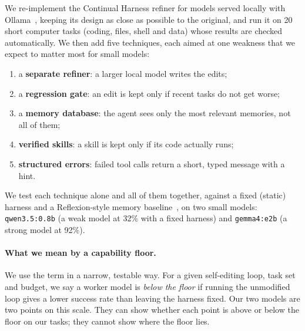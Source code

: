 We re-implement the Continual Harness refiner for models served locally with Ollama~\cite{ollama},
keeping its design as close as possible to the original, and run it on 20 short computer tasks
(coding, files, shell and data) whose results are checked automatically. We then add five
techniques, each aimed at one weakness that we expect to matter most for small models:
\begin{enumerate}
  \item a \textbf{separate refiner}: a larger local model writes the edits;
  \item a \textbf{regression gate}: an edit is kept only if recent tasks do not get worse;
  \item a \textbf{memory database}: the agent sees only the most relevant memories, not all of them;
  \item \textbf{verified skills}: a skill is kept only if its code actually runs;
  \item \textbf{structured errors}: failed tool calls return a short, typed message with a hint.
\end{enumerate}
We test each technique alone and all of them together, against a fixed (static) harness and a
Reflexion-style memory baseline~\cite{shinn2023reflexion}, on two small models: \texttt{qwen3.5:0.8b}
(a weak model at 32\% with a fixed harness) and \texttt{gemma4:e2b} (a strong model at 92\%).

\paragraph{What we mean by a capability floor.}
We use the term in a narrow, testable way. For a given self-editing loop, task set and budget, we
say a worker model is \emph{below the floor} if running the unmodified loop gives a lower success
rate than leaving the harness fixed. Our two models are two points on this scale. They can show
whether each point is above or below the floor on our tasks; they cannot show where the floor lies.

